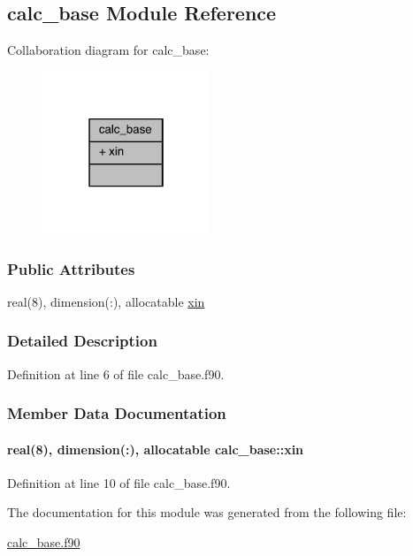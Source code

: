 \hypertarget{classcalc__base}{\subsection{calc\-\_\-base Module Reference}
\label{classcalc__base}
}


Collaboration diagram for calc\-\_\-base\-:
\nopagebreak
\begin{figure}[H]
\begin{center}
\leavevmode
\includegraphics[width=142pt]{classcalc__base__coll__graph}
\end{center}
\end{figure}
\subsubsection*{Public Attributes}
\begin{DoxyCompactItemize}
\item 
real(8), dimension(\-:), allocatable \hyperlink{classcalc__base_ad1d3e82096a7340240b373c390d73958}{xin}
\end{DoxyCompactItemize}


\subsubsection{Detailed Description}


Definition at line 6 of file calc\-\_\-base.\-f90.



\subsubsection{Member Data Documentation}
\hypertarget{classcalc__base_ad1d3e82096a7340240b373c390d73958}{
\paragraph[{xin}]{\setlength{\rightskip}{0pt plus 5cm}real(8), dimension(\-:), allocatable calc\-\_\-base\-::xin}}\label{classcalc__base_ad1d3e82096a7340240b373c390d73958}


Definition at line 10 of file calc\-\_\-base.\-f90.



The documentation for this module was generated from the following file\-:\begin{DoxyCompactItemize}
\item 
\hyperlink{calc__base_8f90}{calc\-\_\-base.\-f90}\end{DoxyCompactItemize}

